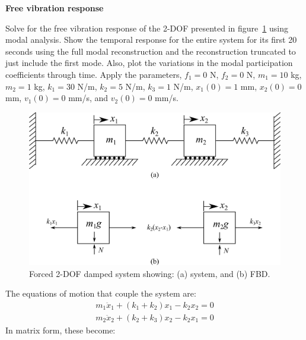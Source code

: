 \documentclass[12pt,letter]{article}
\begin{document}
	\begin{example}
	\textbf{Free vibration response}
	
	Solve for the free vibration response of the 2-DOF presented in figure~\ref{fig:2-DOF-spring_mass_horizontal_double_wall} using modal analysis. Show the temporal response for the entire system for its first 20 seconds using the full modal reconstruction and the reconstruction truncated to just include the first mode. Also, plot the variations in the modal participation coefficients through time. Apply the parameters, $f_1 = 0$ N, $f_2 = 0$ N, $m_1 = 10$ kg, $m_2 = 1$ kg, $k_1 = 30$ N/m, $k_2 = 5$ N/m, $k_3 = 1$ N/m, $x_1(0) = 1$ mm, $x_2(0) = 0$ mm, $v_1(0) = 0$ mm/s, and $v_2(0) = 0$ mm/s.
	
	\begin{figure}[H]
		\centering
		\includegraphics[]{../figures/2-DOF-spring_mass_horizontal_double_wall.png}
		\caption{Forced 2-DOF damped system showing: (a) system, and (b) FBD.}
		\label{fig:2-DOF-spring_mass_horizontal_double_wall}
	\end{figure}
	
	
	The equations of motion that couple the system are:
	\begin{eqnarray}
	m_1\ddot{x}_1 + (k_1+k_2)x_1 - k_2x_2 = 0 \\
	m_2\ddot{x}_2 + (k_2+k_3)x_2 - k_2x_1 = 0 \nonumber
	\end{eqnarray}
	In matrix form, these become:
	

\end{example}
\end{document}
